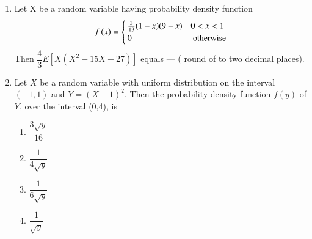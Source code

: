 \begin{enumerate}[label=\thesection.\arabic*.,ref=\thesection.\theenumi]
  \item Let X be a random variable having probability density function 
  \begin{align}
  \label{st2021-22:eq:qpdf_X}
  f\brak{x} = 
  \begin{cases}
  \frac{3}{13}(1-x)(9-x) & 0 < x < 1
  \\
  0 & \text{ otherwise}
  \end{cases}
  \end{align}
  Then $\dfrac{4}{3} E [X(X^2 -15X + 27 ) ] $ equals --- ( round of to two decimal places). \\
  \solution
    
%
\item  Let $X$ be a random variable with uniform distribution on the interval $(-1, 1)$ and $Y=(X + 1)^2$. Then the probability density function $f(y)$ of $Y$, over the interval (0,4), is 
\begin{enumerate}
\item $\dfrac{3\sqrt{y}}{16}$ \\
\item $\dfrac{1}{4\sqrt{y}}$ \\
\item $\dfrac{1}{6\sqrt{y}}$ \\
\item $\dfrac{1}{\sqrt{y}}$ 
\end{enumerate}
%
  \solution 
  
    

\end{enumerate}